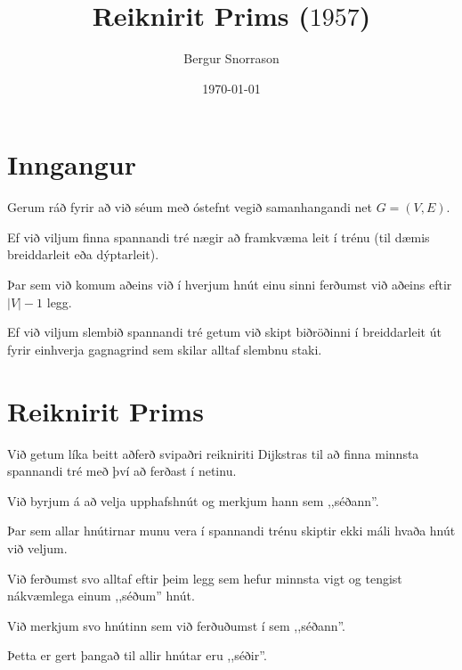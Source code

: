 \title{Reiknirit Prims ($1957$)}
\author{Bergur Snorrason}
\date{\today}



\frame{\titlepage}

\section{Inngangur}
{
    {
        \item<1-> Gerum ráð fyrir að við séum með óstefnt vegið samanhangandi net $G = (V, E)$.
        \item<2-> Ef við viljum finna spannandi tré nægir að framkvæma leit í trénu (til dæmis breiddarleit eða dýptarleit).
        \item<3-> Þar sem við komum aðeins við í hverjum hnút einu sinni ferðumst við aðeins eftir $|V| - 1$ legg.
        \item<4-> Ef við viljum slembið spannandi tré getum við skipt biðröðinni í breiddarleit út fyrir einhverja gagnagrind
            sem skilar alltaf slembnu staki.
    }
}

\section{Reiknirit Prims}
{
    {
        \item<1-> Við getum líka beitt aðferð svipaðri reikniriti Dijkstras til að finna minnsta spannandi tré með því að ferðast í netinu.
        \item<2-> Við byrjum á að velja upphafshnút og merkjum hann sem ,,séðann''.
        \item<3-> Þar sem allar hnútirnar munu vera í spannandi trénu skiptir ekki máli hvaða hnút við veljum.
        \item<4-> Við ferðumst svo alltaf eftir þeim legg sem hefur minnsta vigt og tengist nákvæmlega einum ,,séðum'' hnút.
        \item<5-> Við merkjum svo hnútinn sem við ferðuðumst í sem ,,séðann''.
        \item<6-> Þetta er gert þangað til allir hnútar eru ,,séðir''.
    }
}

